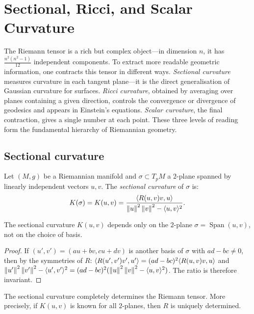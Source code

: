 \chapter{Sectional, Ricci, and Scalar Curvature}
\label{ch:curvatures}

The Riemann tensor is a rich but complex object---in dimension $n$, it has $\frac{n^2(n^2-1)}{12}$ independent components. To extract more readable geometric information, one contracts this tensor in different ways. \emph{Sectional curvature} measures curvature in each tangent plane---it is the direct generalisation of Gaussian curvature for surfaces. \emph{Ricci curvature}, obtained by averaging over planes containing a given direction, controls the convergence or divergence of geodesics and appears in Einstein's equations. \emph{Scalar curvature}, the final contraction, gives a single number at each point. These three levels of reading form the fundamental hierarchy of Riemannian geometry.

\section{Sectional curvature}

\begin{definition}
Let $(M, g)$ be a Riemannian manifold and $\sigma \subset T_pM$ a $2$-plane
spanned by linearly independent vectors $u, v$. The \emph{sectional curvature}
of $\sigma$ is:
\[
    K(\sigma) = K(u, v) = \frac{\langle R(u,v)v, u \rangle}{\left\| u \right\|^2\left\| v \right\|^2 - \langle u, v \rangle^2}.
\]
\end{definition}

\begin{proposition}
The sectional curvature $K(u,v)$ depends only on the $2$-plane
$\sigma = \operatorname{Span}(u,v)$, not on the choice of basis.
\end{proposition}

\begin{proof}
If $(u', v') = (au + bv, cu + dv)$ is another basis of $\sigma$ with $ad - bc \neq 0$,
then by the symmetries of $R$:
$\langle R(u',v')v', u' \rangle = (ad-bc)^2 \langle R(u,v)v, u \rangle$
and $\left\| u' \right\|^2\left\| v' \right\|^2 - \langle u', v' \rangle^2 = (ad-bc)^2(\left\| u \right\|^2\left\| v \right\|^2 - \langle u, v \rangle^2)$.
The ratio is therefore invariant.
\end{proof}

\begin{theorem}
The sectional curvature completely determines the Riemann tensor. More precisely,
if $K(u,v)$ is known for all $2$-planes, then $R$ is uniquely determined.
\end{theorem}

